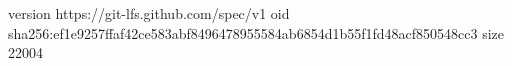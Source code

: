 version https://git-lfs.github.com/spec/v1
oid sha256:ef1e9257ffaf42ce583abf8496478955584ab6854d1b55f1fd48acf850548cc3
size 22004
